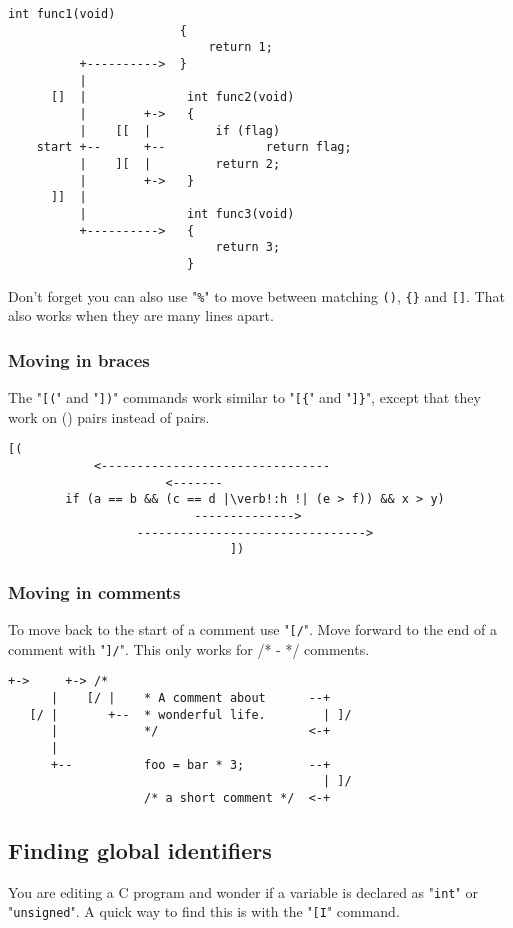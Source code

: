 \begin{Verbatim}[samepage=true]
                        int func1(void)
                        {
                            return 1;
          +---------->  }
          |
      []  |              int func2(void)
          |        +->   {
          |    [[  |         if (flag)
    start +--      +--              return flag;
          |    ][  |         return 2;
          |        +->   }
      ]]  |
          |              int func3(void)
          +---------->   {
                             return 3;
                         }
\end{Verbatim}

Don't forget you can also use "\verb!%!" to move between matching \verb!()!, \verb!{}! and \verb![]!.
That also works when they are many lines apart.
\subsubsection{Moving in braces}
The "\verb![(!" and "\verb!])!" commands work similar to "\verb![{!" and "\verb!]}!", except that they work on () pairs instead of {} pairs.

\begin{Verbatim}[samepage=true]
                          [(
            <--------------------------------
                      <-------
        if (a == b && (c == d |\verb!:h !| (e > f)) && x > y) 
                          -------------->
                  -------------------------------->
                               ])
\end{Verbatim}

\subsubsection{Moving in comments}
To move back to the start of a comment use "\verb![/!".
Move forward to the end of a comment with "\verb!]/!".
This only works for /* - */ comments.

\begin{Verbatim}[samepage=true]
      +->     +-> /*
      |    [/ |    * A comment about      --+
   [/ |       +--  * wonderful life.        | ]/
      |            */                     <-+
      |
      +--          foo = bar * 3;         --+
                                            | ]/
                   /* a short comment */  <-+
\end{Verbatim}
\subsection{Finding global identifiers}
You are editing a C program and wonder if a variable is declared as "\verb!int!" or "\verb!unsigned!".
A quick way to find this is with the "\verb![I!" command.

